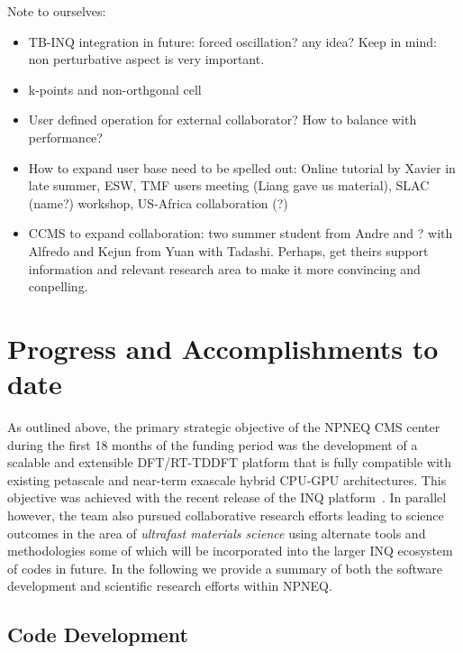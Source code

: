 {\color{green}
Note to ourselves:
\begin{itemize}
    \item TB-INQ integration in future: forced oscillation? any idea? Keep in mind: non perturbative aspect is very important.
    \item k-points and non-orthgonal cell
    \item User defined operation for external collaborator? How to balance with performance?
    \item How to expand user base need to be spelled out: Online tutorial by Xavier in late summer, ESW, TMF users meeting (Liang gave us material), SLAC (name?) workshop, US-Africa collaboration (?)
    \item CCMS to expand collaboration: two summer student from Andre and ? with Alfredo and Kejun from Yuan with Tadashi. Perhaps, get theirs support information and relevant research area to make it more convincing and conpelling.
\end{itemize}

}
\clearpage

\section{Progress and Accomplishments to date} 
As outlined above, the primary strategic objective of the NPNEQ CMS center during the first 18 months of the funding period was the development of a scalable and extensible DFT/RT-TDDFT platform that is fully compatible with existing petascale and near-term exascale hybrid CPU-GPU architectures. This objective was achieved with the recent release of the INQ platform~\cite{Andrade2021}. In parallel however, the team also pursued collaborative research efforts leading to science outcomes in the area of \textit{ultrafast materials science} using alternate tools and methodologies some of which will be incorporated into the larger INQ ecosystem of codes in future. In the following we provide a summary of both the software development and scientific research efforts within NPNEQ.   
\subsection{Code Development}
